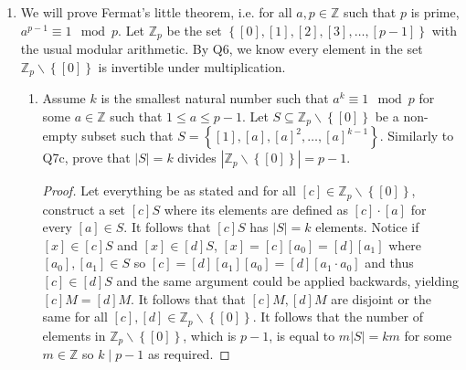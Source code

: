 \documentclass[letterpaper,12pt]{article}
\newcommand{\set}[1]{\left\{ #1 \right\}}
\begin{document}
\begin{enumerate}
\begin{enumerate}
\begin{proof}
        \end{proof}
        \item Prove that $|M|$ divides $n$. (Hint: consider equivalence classes under the relation where for all $[a], [b] \in \mathbb{Z}_n$, $[a] \sim [b]$ if and only if $[a] + [n-b] \in M$) \begin{proof}
            Let everything be as stated. For all $[c] \notin M$ but $[c] \in \mathbb{Z}_n$, construct a set $[c]+M$ where for all $[x] \in [c] + M$, $[x] = [c] + [a]$ for some $[a] \in M$. Notice by construction, $[c] + M$ has $|M|$ elements and every element in $\mathbb{Z}_n$ lies in some $[c] + M$. Notice if $[y] \in [c]+M$ and $[y] \in [d] + M$ for some $[c],[d] \in \mathbb{Z}_n$, then $[y] = [c] + [a_0] = [d] + [a_1]$ where $[a_0],[a_1] \in M$ so $[c] = [d] + [a_0] + [a_1] = d + [a_0+a_1]$ so $[c] \in [d] + M$ and the same argument could be applied backwards, yielding $[c] + M = [d] + M$. It follows that $[c]+M,[d]+M$ are disjoint or the same for all $[c],[d] \in \mathbb{Z}_n$. Hence, we know that $\mathbb{Z}_n$ is a disjoint union of sets of the form $[c] + M$, all of which have $|M|$ elements. It follows that the number of elements in $\mathbb{Z}_n$, which is $n$, is equal to $\ell|M|$ for some $\ell \in \mathbb{Z}$ so $|M|$ divides $n$ as required.
        \end{proof}
    \end{enumerate}
    \item We will prove Fermat's little theorem, i.e. for all $a ,p \in \mathbb{Z}$ such that $p$ is prime, $a^{p-1} \equiv 1 \mod p$. Let $\mathbb{Z}_p$ be the set $\set{[0],[1],[2],[3],\ldots,[p-1]}$ with the usual modular arithmetic. By Q6, we know every element in the set $\mathbb{Z}_p \backslash \set{[0]}$ is invertible under multiplication. \begin{enumerate}
        \item Assume $k$ is the smallest natural number such that $a^k \equiv 1 \mod p$ for some $a \in \mathbb{Z}$ such that $1 \leq a \leq p-1$. Let $S \subseteq \mathbb{Z}_p \backslash \set{[0]}$ be a non-empty subset such that $S = \set{[1],[a],[a]^2, \ldots, [a]^{k-1}}$. Similarly to Q7c, prove that $|S| = k$ divides $|\mathbb{Z}_p \backslash \set{[0]}| = p-1$. \begin{proof}
            Let everything be as stated and for all $[c] \in \mathbb{Z}_p \backslash \set{[0]}$, construct a set $[c]S$ where its elements are defined as $[c] \cdot [a]$ for every $[a] \in S$. It follows that $[c] S$ has $|S| = k$ elements. Notice if $[x] \in [c]S$ and $[x] \in [d]S$, $[x] = [c][a_0] = [d][a_1]$ where $[a_0],[a_1] \in S$ so $[c] = [d][a_1][a_0] = [d][a_1 \cdot a_0]$ and thus $[c] \in [d]S$ and the same argument could be applied backwards, yielding $[c]M = [d]M$. It follows that that $[c]M,[d]M$ are disjoint or the same for all $[c],[d] \in \mathbb{Z}_p \backslash \set{[0]}$. It follows that the number of elements in $\mathbb{Z}_p \backslash \set{[0]}$, which is $p-1$, is equal to $m |S| = km$ for some $m \in \mathbb{Z}$ so $k \mid p-1$ as required.

\end{proof}
\end{enumerate}
\end{enumerate}
\end{document}

